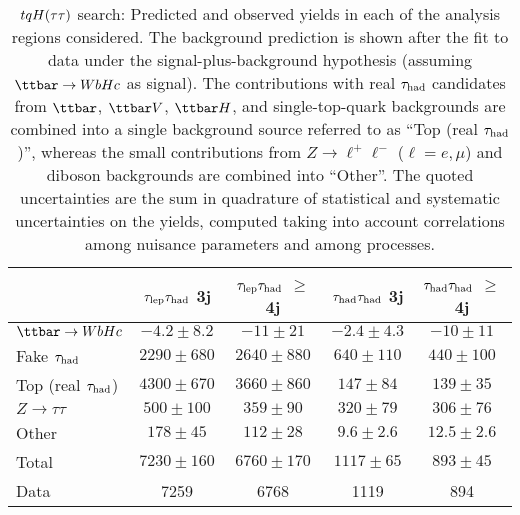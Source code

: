 \begin{table}[htbp]
\small
\begin{center}
\begin{tabular}{l*{4}{c}}
\hline\hline
 & $\tau_{\mathrm{lep}} \tau_{\mathrm{had}}$ 3j & $\tau_{\mathrm{lep}} \tau_{\mathrm{had}}$ $\geq$4j & $\tau_{\mathrm{had}} \tau_{\mathrm{had}}$ 3j &  $\tau_{\mathrm{had}} \tau_{\mathrm{had}}$ $\geq$4j \\
\hline
$\Hc$  &   $ -4.2 \pm 8.2 $ &   $ -11 \pm 21 $ &   $ -2.4 \pm 4.3 $ &   $ -10 \pm 11 $ \\ 
\hline
Fake $\tau_{\mathrm{had}}$  &   $ 2290 \pm 680 $ &   $ 2640 \pm 880 $ &   $ 640 \pm 110 $ &   $ 440 \pm 100 $ \\ 
Top (real $\tau_{\mathrm{had}}$)  &   $ 4300 \pm 670 $ &   $ 3660 \pm 860 $ &   $ 147 \pm 84 $ &   $ 139 \pm 35 $ \\ 
$Z \to \tau\tau$  &   $ 500 \pm 100 $ &   $ 359 \pm 90 $ &   $ 320 \pm 79 $ &   $ 306 \pm 76 $ \\ 
Other  &   $ 178 \pm 45 $ &   $ 112 \pm 28 $ &   $ 9.6 \pm 2.6 $ &   $ 12.5 \pm 2.6 $ \\ 
\hline
Total  &   $ 7230 \pm 160 $ &   $ 6760 \pm 170 $ &   $ 1117 \pm 65 $ &   $ 893 \pm 45 $ \\
\hline
Data & 7259  & 6768  & 1119  & 894 \\ 
\hline\hline    
\end{tabular}

%
\end{center}
\caption{
$tqH(\tau\tau)$ search: Predicted and observed yields in each of the analysis regions considered.
The background prediction is shown after the fit to data under the signal-plus-background hypothesis 
(assuming $\Hc$ as signal).
The contributions with real $\tau_{\mathrm{had}}$ candidates from $\ttbar$,  $\ttbar V$, $\ttbar H$, and single-top-quark backgrounds are combined into
a single background source referred to as ``Top (real $\tau_{\mathrm{had}}$)'', whereas the small contributions from 
$Z\to \ell^+\ell^-$ ($\ell = e, \mu$) and diboson backgrounds are combined into ``Other''. 
The quoted uncertainties are the sum in quadrature of statistical and systematic uncertainties on the yields, 
computed taking into account correlations among nuisance parameters and among processes.
}
\label{tab:Htautau_Postfit_Yields_Unblind_Hc}
\end{table} 

